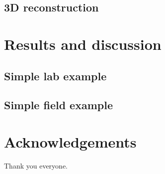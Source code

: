 \documentclass[fleqn,10pt]{wlpeerj}
\begin{document}
\subsection*{3D reconstruction}

\section*{Results and discussion}
\subsection*{Simple lab example}
\subsection*{Simple field example}

\section*{Acknowledgements}
Thank you everyone.


\end{document}
